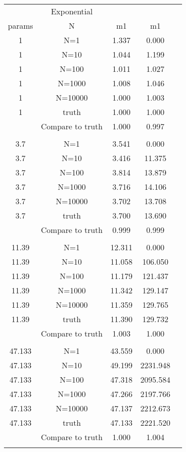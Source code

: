     \newpage
    \begin{table}[h!]
        \begin{center} {\footnotesize
        \begin{tabular}{ccccc}
        \hline
        & \multicolumn{1}{c}{ Exponential }  \\
        \multicolumn{1}{c}{params} & \multicolumn{1}{c}{N} & \multicolumn{1}{c}{m1} & \multicolumn{1}{c}{m1}\\
        \hline
        
1 & N=1 & 1.337 & 0.000 \\
1 & N=10 & 1.044 & 1.199 \\
1 & N=100 & 1.011 & 1.027 \\
1 & N=1000 & 1.008 & 1.046 \\
1 & N=10000 & 1.000 & 1.003 \\
1 & truth & 1.000 & 1.000 \\
 & Compare to truth & 1.000 & 0.997 \\
\\
3.7 & N=1 & 3.541 & 0.000 \\
3.7 & N=10 & 3.416 & 11.375 \\
3.7 & N=100 & 3.814 & 13.879 \\
3.7 & N=1000 & 3.716 & 14.106 \\
3.7 & N=10000 & 3.702 & 13.708 \\
3.7 & truth & 3.700 & 13.690 \\
 & Compare to truth & 0.999 & 0.999 \\
\\
11.39 & N=1 & 12.311 & 0.000 \\
11.39 & N=10 & 11.058 & 106.050 \\
11.39 & N=100 & 11.179 & 121.437 \\
11.39 & N=1000 & 11.342 & 129.147 \\
11.39 & N=10000 & 11.359 & 129.765 \\
11.39 & truth & 11.390 & 129.732 \\
 & Compare to truth & 1.003 & 1.000 \\
\\
47.133 & N=1 & 43.559 & 0.000 \\
47.133 & N=10 & 49.199 & 2231.948 \\
47.133 & N=100 & 47.318 & 2095.584 \\
47.133 & N=1000 & 47.266 & 2197.766 \\
47.133 & N=10000 & 47.137 & 2212.673 \\
47.133 & truth & 47.133 & 2221.520 \\
 & Compare to truth & 1.000 & 1.004 \\
\\
\hline
        \end{tabular} }
        \end{center}
        \label{turns}
    \end{table}
    

